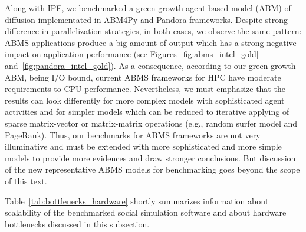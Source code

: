Along  with IPF,
we benchmarked a green growth agent-based model (ABM) of diffusion implementated in \textsf{ABM4Py} and \textsf{Pandora} frameworks.
Despite strong difference in parallelization  strategies,
in  both  cases,  we  observe  the same pattern:
ABMS  applications produce  a  big  amount  of  output  which  has  a  strong  negative  impact  on  application performance
(see Figures~\ref{fig:abms_intel_gold} and~\ref{fig:pandora_intel_gold}).
As a consequence, according to our green growth ABM, being I/O bound,
current ABMS frameworks for HPC have moderate requirements to CPU performance.
Nevertheless, we must emphasize that the results can look differently for
more complex models with sophisticated agent activities
and for simpler models which can be reduced to iterative applying of sparse matrix-vector or matrix-matrix operations
(e.g., random surfer model and PageRank).
Thus, our benchmarks for ABMS frameworks are not very illuminative
and must  be  extended  with  more sophisticated and more simple models to provide more evidences and draw stronger conclusions.
But discussion of the new representative ABMS models for benchmarking goes beyond the scope of this text.

Table~\ref{tab:bottlenecks_hardware} shortly summarizes information about scalability of the benchmarked social simulation software
and about hardware bottlenecks discussed in this subsection.





